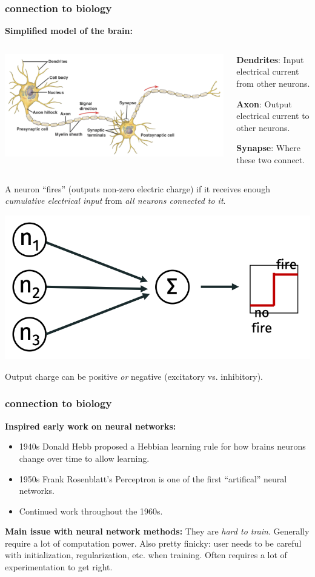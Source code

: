 \documentclass[handout,compress]{beamer}
\begin{document}
\begin{frame}
	\frametitle{connection to biology}
	\small
	\textbf{Simplified model of the brain:}
	\begin{columns}
		\begin{column}{.55\textwidth}
			\includegraphics[width=\textwidth]{neurons.png}
		\end{column}
		\begin{column}{.45\textwidth}
			\textbf{Dendrites}: Input electrical current from other neurons.
			
			\textbf{Axon}: Output electrical current to other neurons.
			
			\textbf{Synapse}: Where these two connect.
		\end{column}
	\end{columns}
	A neuron ``fires'' (outputs non-zero electric charge) if it receives enough \emph{cumulative electrical input} from \emph{all neurons connected to it}. 
	\begin{center}
		\includegraphics[width=.4\textwidth]{neural_model.png}
	\end{center}
	Output charge can be positive \emph{or} negative (excitatory vs. inhibitory). 
\end{frame}

\begin{frame}
	\frametitle{connection to biology}
	\textbf{Inspired early work on neural networks:}
	\begin{itemize}
		\item 1940s Donald Hebb proposed a Hebbian learning rule for how brains neurons change over time to allow learning.
		\item 1950s Frank Rosenblatt's Perceptron is one of the first ``artifical'' neural networks.
		\item Continued work throughout the 1960s. 
	\end{itemize}
\textbf{Main issue with neural network methods:} They are \emph{hard to train}. Generally require a lot of computation power. Also pretty finicky: user needs to be careful with initialization, regularization, etc. when training.  Often requires a lot of experimentation to get right.
\end{frame}
\end{document}
